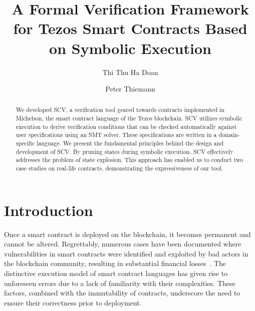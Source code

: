 \documentclass[runningheads]{llncs}
\begin{document}
%
\title{A Formal Verification Framework for Tezos Smart Contracts Based on Symbolic Execution}
%
%
\author{Thi Thu Ha Doan\and Peter Thiemann}

%
%
%
\maketitle              %
%
\begin{abstract}
We developed SCV, a verification tool geared towards contracts implemented in Michelson, the smart contract language of the Tezos blockchain. SCV utilizes symbolic execution to derive verification conditions that can be checked automatically against user specifications using an SMT solver. These specifications are written in a domain-specific language. We present the fundamental principles behind the design and development of SCV. By pruning states during symbolic execution, SCV effectively addresses the problem of state explosion. This approach has enabled us to conduct two case studies on real-life contracts, demonstrating the expressiveness of our tool.
\end{abstract}
\section{Introduction}
\label{sec:introduction}

Once a smart contract is deployed on the blockchain, it becomes permanent and cannot be altered.
Regrettably, numerous cases have been documented where vulnerabilities
in smart contracts were identified and exploited by bad actors in the blockchain community, resulting in substantial financial losses~\cite{dao,wallethack}. The distinctive execution model of smart contract languages has given rise to unforeseen errors due to a lack of familiarity with their complexities. These factors, combined with the immutability of contracts, underscore the need to ensure their correctness prior to deployment.
\end{document}

